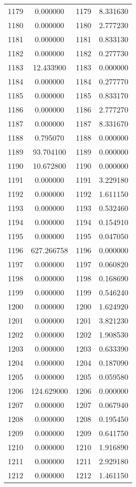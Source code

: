 \documentclass[12pt]{article}
\begin{document}
\begin{longtable}{@{}cccc@{}}
1179 & 0.000000 & 1179 & 8.331630 \\
1180 & 0.000000 & 1180 & 2.777230 \\
1181 & 0.000000 & 1181 & 0.833130 \\
1182 & 0.000000 & 1182 & 0.277730 \\
1183 & 12.433900 & 1183 & 0.000000 \\
1184 & 0.000000 & 1184 & 0.277770 \\
1185 & 0.000000 & 1185 & 0.833170 \\
1186 & 0.000000 & 1186 & 2.777270 \\
1187 & 0.000000 & 1187 & 8.331670 \\
1188 & 0.795070 & 1188 & 0.000000 \\
1189 & 93.704100 & 1189 & 0.000000 \\
1190 & 10.672800 & 1190 & 0.000000 \\
1191 & 0.000000 & 1191 & 3.229180 \\
1192 & 0.000000 & 1192 & 1.611150 \\
1193 & 0.000000 & 1193 & 0.532460 \\
1194 & 0.000000 & 1194 & 0.154910 \\
1195 & 0.000000 & 1195 & 0.047050 \\
1196 & 627.266758 & 1196 & 0.000000 \\
1197 & 0.000000 & 1197 & 0.060820 \\
1198 & 0.000000 & 1198 & 0.168690 \\
1199 & 0.000000 & 1199 & 0.546240 \\
1200 & 0.000000 & 1200 & 1.624920 \\
1201 & 0.000000 & 1201 & 3.821230 \\
1202 & 0.000000 & 1202 & 1.908530 \\
1203 & 0.000000 & 1203 & 0.633390 \\
1204 & 0.000000 & 1204 & 0.187090 \\
1205 & 0.000000 & 1205 & 0.059580 \\
1206 & 124.629000 & 1206 & 0.000000 \\
1207 & 0.000000 & 1207 & 0.067940 \\
1208 & 0.000000 & 1208 & 0.195450 \\
1209 & 0.000000 & 1209 & 0.641750 \\
1210 & 0.000000 & 1210 & 1.916890 \\
1211 & 0.000000 & 1211 & 2.929180 \\
1212 & 0.000000 & 1212 & 1.461150 \\

\end{longtable}
\end{document}
